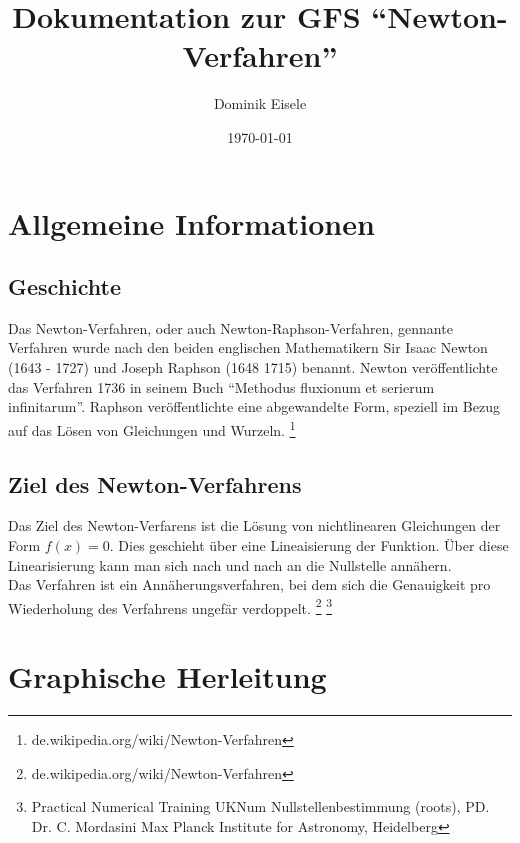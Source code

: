 \documentclass[a4paper,12pt,fleqn,oneside]{article}
\author{Dominik Eisele}
\title{Dokumentation zur GFS "`Newton-Verfahren"'}
\date{\today}
\begin{document}
\normalem

\begin{titlepage}
	\maketitle
\end{titlepage}

\tableofcontents

\newpage

\section{Allgemeine Informationen}
	\subsection{Geschichte}
		Das Newton-Verfahren, oder auch Newton-Raphson-Verfahren, gennante Verfahren wurde nach den beiden englischen Mathematikern Sir 
		Isaac Newton (1643 - 1727) und Joseph Raphson (1648 1715) benannt. Newton veröffentlichte das Verfahren 1736 in seinem Buch
		"`Methodus fluxionum et serierum infinitarum"'. Raphson veröffentlichte eine abgewandelte Form, speziell im Bezug auf das Lösen von
		Gleichungen und Wurzeln. \footnote{de.wikipedia.org/wiki/Newton-Verfahren}
		
	\subsection{Ziel des Newton-Verfahrens}
		Das Ziel des Newton-Verfarens ist die Lösung von nichtlinearen Gleichungen der Form $f(x) = 0$. Dies geschieht über eine Lineaisierung der
		Funktion. Über diese Linearisierung kann man sich nach und nach an die Nullstelle annähern.\\
		Das Verfahren ist ein Annäherungsverfahren, bei dem sich die Genauigkeit pro Wiederholung des Verfahrens ungefär verdoppelt.
		\footnote{de.wikipedia.org/wiki/Newton-Verfahren}
		\footnote{Practical Numerical Training UKNum Nullstellenbestimmung (roots), PD. Dr. C. Mordasini Max Planck Institute for Astronomy, Heidelberg}
		
\newpage

\section{Graphische Herleitung}
	
\end{document}
